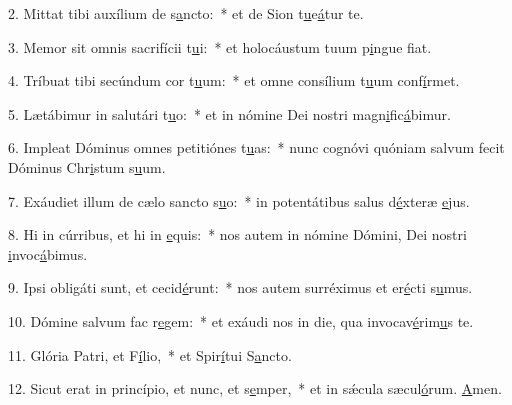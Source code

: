 2. Mittat tibi auxílium de s\uline{a}ncto:~* et de Sion t\uline{u}e\uline{á}tur te.\par 
3. Memor sit omnis sacrifícii t\uline{u}i:~* et holocáustum tuum p\uline{i}ngue f\uline{i}at.\par 
4. Tríbuat tibi secúndum cor t\uline{u}um:~* et omne consílium t\uline{u}um conf\uline{í}rmet.\par 
5. Lætábimur in salutári t\uline{u}o:~* et in nómine Dei nostri magn\uline{i}fic\uline{á}bimur.\par 
6. Impleat Dóminus omnes petitiónes t\uline{u}as:~* nunc cognóvi quóniam salvum fecit Dóminus Chr\uline{i}stum s\uline{u}um.\par 
7. Exáudiet illum de cælo sancto s\uline{u}o:~* in potentátibus salus d\uline{é}xteræ \uline{e}jus.\par 
8. Hi in cúrribus, et hi in \uline{e}quis:~* nos autem in nómine Dómini, Dei nostri \uline{i}nvoc\uline{á}bimus.\par 
9. Ipsi obligáti sunt, et cecid\uline{é}runt:~* nos autem surréximus et er\uline{é}cti s\uline{u}mus.\par 
10. Dómine salvum fac r\uline{e}gem:~* et exáudi nos in die, qua invocav\uline{é}rim\uline{u}s te.\par 
11. Glória Patri, et F\uline{í}lio,~* et Spir\uline{í}tui S\uline{a}ncto.\par 
12. Sicut erat in princípio, et nunc, et s\uline{e}mper,~* et in sǽcula sæcul\uline{ó}rum. \uline{A}men.\par 
